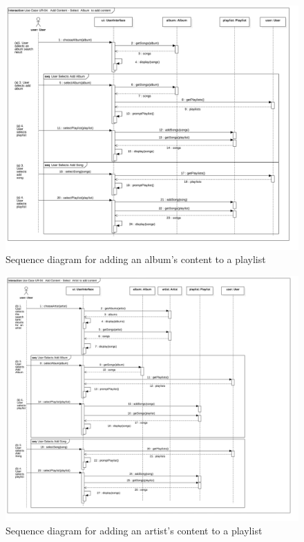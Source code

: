 \documentclass[12pt]{article}
\begin{document}
	\begin{figure}[H]
		\centering
		\includegraphics[scale=0.35]{UseCaseAddAlbum.png}
		\caption{Sequence diagram for adding an album's content to a playlist}
		\label{fig:sequenceAlbum}
	\end{figure}
	\begin{figure}[H]
		\centering
		\includegraphics[scale=0.35]{UseCaseAddArtist.png}
		\caption{Sequence diagram for adding an artist's content to a playlist}
		\label{fig:sequenceArtist}
	\end{figure}
\end{document}
